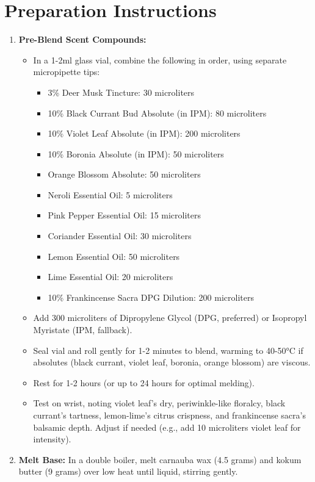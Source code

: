 \documentclass{article}
\begin{document}
\section*{Preparation Instructions}
\begin{enumerate}
  \item \textbf{Pre-Blend Scent Compounds:}
  \begin{itemize}
    \item In a 1-2ml glass vial, combine the following in order, using separate micropipette tips:
    \begin{itemize}
      \item 3\% Deer Musk Tincture: 30 microliters
      \item 10\% Black Currant Bud Absolute (in IPM): 80 microliters
      \item 10\% Violet Leaf Absolute (in IPM): 200 microliters
      \item 10\% Boronia Absolute (in IPM): 50 microliters
      \item Orange Blossom Absolute: 50 microliters
      \item Neroli Essential Oil: 5 microliters
      \item Pink Pepper Essential Oil: 15 microliters
      \item Coriander Essential Oil: 30 microliters
      \item Lemon Essential Oil: 50 microliters
      \item Lime Essential Oil: 20 microliters
      \item 10\% Frankincense Sacra DPG Dilution: 200 microliters
    \end{itemize}
    \item Add 300 microliters of Dipropylene Glycol (DPG, preferred) or Isopropyl Myristate (IPM, fallback).
    \item Seal vial and roll gently for 1-2 minutes to blend, warming to 40-50°C if absolutes (black currant, violet leaf, boronia, orange blossom) are viscous.
    \item Rest for 1-2 hours (or up to 24 hours for optimal melding).
    \item Test on wrist, noting violet leaf’s dry, periwinkle-like floralcy, black currant’s tartness, lemon-lime’s citrus crispness, and frankincense sacra’s balsamic depth. Adjust if needed (e.g., add 10 microliters violet leaf for intensity).
  \end{itemize}
  \item \textbf{Melt Base:} In a double boiler, melt carnauba wax (4.5 grams) and kokum butter (9 grams) over low heat until liquid, stirring gently.

\end{enumerate}
\end{document}
